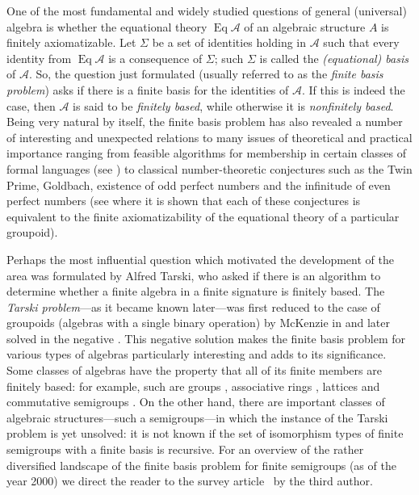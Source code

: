 \documentclass[preprint,1p,times]{elsarticle}
\DeclareMathOperator{\Id}{Eq}
\numberwithin{equation}{section}
\theoremstyle{remark}
\def\Si{\Sigma}
\begin{document}
One of the most fundamental and widely studied questions of general (universal) algebra is whether the equational
theory $\Id \mathcal{A}$ of an algebraic structure $A$ is finitely axiomatizable. Let $\Si$ be a set of identities
holding in $\mathcal{A}$ such that every identity from $\Id \mathcal{A}$ is a consequence of $\Si$; such $\Si$ is
called the \emph{(equational) basis} of $\mathcal{A}$. So, the question just formulated (usually referred to as the
\emph{finite basis problem}) asks if there is a finite basis for the identities of $\mathcal{A}$. If this is indeed the
case, then $\mathcal{A}$ is said to be \emph{finitely based}, while otherwise it is \emph{nonfinitely based}. Being
very natural by itself, the finite basis problem has also revealed a number of interesting and unexpected relations to
many issues of theoretical and practical importance ranging from feasible algorithms for membership in certain classes
of formal languages (see \cite{Alm95}) to classical number-theoretic conjectures such as the Twin Prime, Goldbach,
existence of odd perfect numbers and the infinitude of even perfect numbers (see \cite{Per89} where it is shown that
each of these conjectures is equivalent to the finite axiomatizability of the equational theory of a particular
groupoid).

Perhaps the most influential question which motivated the development of the area was formulated by Alfred Tarski, who
asked if there is an algorithm to determine whether a finite algebra in a finite signature is finitely based. The
\emph{Tarski problem}---as it became known later---was first reduced to the case of groupoids (algebras with a single
binary operation) by McKenzie in \cite{McK2} and later solved in the negative \cite{McK3}. This negative solution makes
the finite basis problem for various types of algebras particularly interesting and adds to its significance. Some
classes of algebras have the property that all of its finite members are finitely based: for example, such are groups
\cite{OP}, associative rings \cite{Kru,Lvov}, lattices \cite{McK1} and commutative semigroups \cite{Per69}. On the
other hand, there are important classes of algebraic structures---such a semigroups---in which the instance of the
Tarski problem is yet unsolved: it is not known if the set of isomorphism types of finite semigroups with a finite
basis is recursive. For an overview of the rather diversified landscape of the finite basis problem for finite
semigroups (as of the year 2000) we direct the reader to the survey article~\cite{volkovjaponicae} by the third author.
\end{document}
